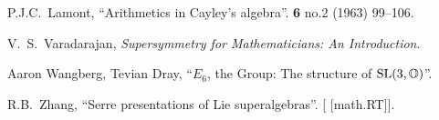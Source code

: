 \begin{thebibliography}{99}
P.J.C.~Lamont,
``Arithmetics in Cayley's algebra''.
 \textbf{6} no.2 (1963) 99--106.
{\tt{}}
        
V.~S.~Varadarajan,
\textit{Supersymmetry for Mathematicians: An Introduction}.

Aaron Wangberg, Tevian Dray,
``$E_{6}$, the Group: The structure of $\operatorname{SL}(3,\mathbb{O})$''.

R.B.~Zhang,
``Serre presentations of Lie superalgebras''.
[ [math.RT]].

\end{thebibliography}


